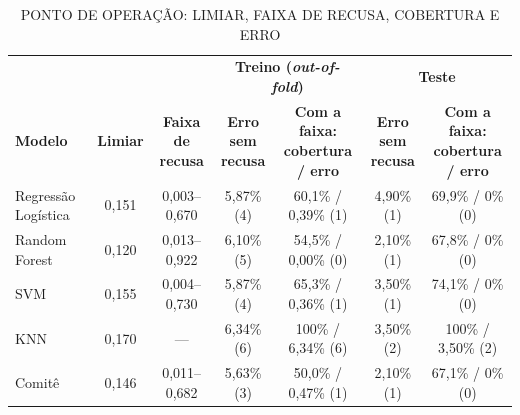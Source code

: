\documentclass[
    12pt
    ,oneside
    ,a4paper
    ,chapter=TITLE
    ,section=TITLE
    ,sumario=abnt-6027-2012
    ,english,brazil]{abntex2} %
\begin{document}
\begin{table}[htbp]
    \centering
    \caption{PONTO DE OPERAÇÃO: LIMIAR, FAIXA DE RECUSA, COBERTURA E ERRO}
    \label{tab:ponto_operacao}
    \footnotesize
    \setlength{\tabcolsep}{2pt}
    \begin{tabular}{@{}lcccccc@{}}
        \toprule
        & & & \multicolumn{2}{c}{\textbf{Treino (\textit{out-of-fold})}} &
        \multicolumn{2}{c}{\textbf{Teste}} \\
        \cmidrule(lr){4-5} \cmidrule(l){6-7}
        \textbf{Modelo} & \textbf{Limiar} & \makecell{\textbf{Faixa de}\\\textbf{recusa}} &
        \makecell{\textbf{Erro sem}\\\textbf{recusa}} &
        \makecell{\textbf{Com a faixa:}\\\textbf{cobertura / erro}} &
        \makecell{\textbf{Erro sem}\\\textbf{recusa}} &
        \makecell{\textbf{Com a faixa:}\\\textbf{cobertura / erro}} \\
        \midrule
        Regressão Logística & 0,151 & 0,003--0,670 & 5,87\% (4) & 60,1\% / 0,39\% (1) & 4,90\% (1) & 69,9\% / 0\% (0) \\
        Random Forest       & 0,120 & 0,013--0,922 & 6,10\% (5) & 54,5\% / 0,00\% (0) & 2,10\% (1) & 67,8\% / 0\% (0) \\
        SVM                 & 0,155 & 0,004--0,730 & 5,87\% (4) & 65,3\% / 0,36\% (1) & 3,50\% (1) & 74,1\% / 0\% (0) \\
        KNN                 & 0,170 & ---          & 6,34\% (6) & 100\% / 6,34\% (6)  & 3,50\% (2) & 100\% / 3,50\% (2) \\
        Comitê              & 0,146 & 0,011--0,682 & 5,63\% (3) & 50,0\% / 0,47\% (1) & 2,10\% (1) & 67,1\% / 0\% (0) \\
        \bottomrule
    \end{tabular}
    \vspace{0.2cm}
    \fonteautor
\end{table}
\end{document}
